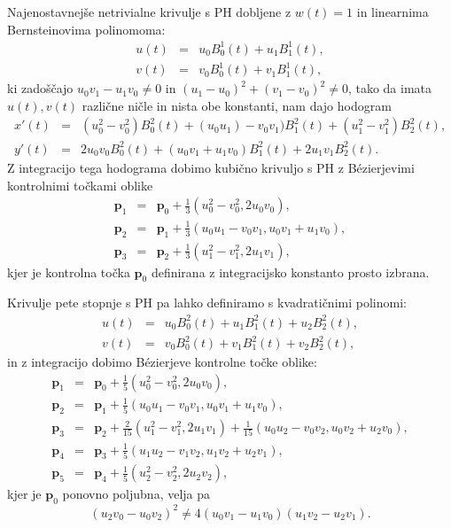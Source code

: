 \documentclass[a4paper]{article}
\begin{document}
	Najenostavnejše netrivialne krivulje s PH dobljene z $w (t) = 1$ in linearnima Bernsteinovima polinomoma:
	\begin{eqnarray}
	u (t) &=& u_0 B^1_0(t) + u_1 B^1_1(t),\nonumber\\
	v (t) &=& v_0 B^1_0(t) + v_1 B^1_1(t),\nonumber
	\end{eqnarray}
	ki zadoščajo $u_0v_1 - u_1v_0\not = 0$ in $(u_1 - u_0)^2+ (v_1 - v_0)^2\not = 0$, tako da imata $u (t), v (t)$ različne ničle in nista obe konstanti, nam dajo hodogram
	\begin{eqnarray}
	x\prime (t) &=& (u^2_0- v^2_0)B^2_0(t) + (u_0u_1)-v_0v_1)B^2_1(t)+(u^2_1-v^2_1)B^2_2(t),\nonumber\\
	y\prime(t) &=& 2u_0v_0B^2_0(t)+(u_0v_1+u_1v_0)B^2_1(t)+2u_1v_1B^2_2(t).\nonumber
	\end{eqnarray}
	Z integracijo tega hodograma dobimo kubično krivuljo s PH z B\'ezierjevimi kontrolnimi točkami oblike
	\begin{eqnarray}
	\textbf{p}_1 &=& \textbf{p}_0 + \frac{1}{3}(u_0^2-v_0^2,2u_0v_0),\nonumber\\
	\textbf{p}_2 &=& \textbf{p}_1 + \frac{1}{3}(u_0u_1-v_0v_1,u_0v_1+u_1v_0),\nonumber\\
	\textbf{p}_3 &=& \textbf{p}_2 + \frac{1}{3}(u_1^2-v_1^2,2u_1v_1),\nonumber
	\end{eqnarray}
	kjer je kontrolna točka $\textbf{p}_0$ definirana z integracijsko konstanto prosto izbrana.
	
	Krivulje pete stopnje s PH pa lahko definiramo s kvadratičnimi polinomi:
	\begin{eqnarray}
	u(t) &=& u_0B_0^2(t)+u_1B_1^2(t)+u_2B_2^2(t),\nonumber\\
	v(t)&=&v_0B_0^2(t)+v_1B_1^2(t)+v_2B_2^2(t),\nonumber
	\end{eqnarray}
	in z integracijo dobimo B\'ezierjeve kontrolne točke oblike:
	\begin{eqnarray}
	\textbf{p}_1 &=& \textbf{p}_0 + \frac{1}{5}(u_0^2-v_0^2,2u_0v_0),\nonumber\\
	\textbf{p}_2 &=& \textbf{p}_1 + \frac{1}{5}(u_0u_1-v_0v_1,u_0v_1+u_1v_0),\nonumber\\
	\textbf{p}_3 &=& \textbf{p}_2 + \frac{2}{15}(u_1^2-v_1^2,2u_1v_1)+\frac{1}{15}(u_0u_2-v_0v_2,u_0v_2+u_2v_0),\nonumber\\
	\textbf{p}_4 &=& \textbf{p}_3 + \frac{1}{5}(u_1u_2-v_1v_2,u_1v_2+u_2v_1),\nonumber\\
	\textbf{p}_5 &=& \textbf{p}_4 + \frac{1}{5}(u_2^2-v_2^2,2u_2v_2),\nonumber
	\end{eqnarray}
	kjer je $\textbf{p}_0$ ponovno poljubna, velja pa
	$$(u_2v_0-u_0v_2)^2\not=4(u_0v_1-u_1v_0)(u_1v_2-u_2v_1).$$
	
\end{document}
